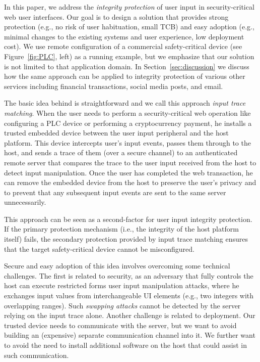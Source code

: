  In this paper, we address the \emph{integrity protection} of user input in security-critical web user interfaces. Our goal is to design a solution that provides strong protection (e.g., no risk of user habituation, small TCB) and easy adoption (e.g., minimal changes to the existing systems and user experience, low deployment cost). We use remote configuration of a commercial safety-critical device (see Figure~\ref{fig:PLC}, left) as a running example, but we emphasize that our solution is not limited to that application domain. In Section~\ref{sec:discussion} we discuss how the same approach can be applied to integrity protection of various other services including financial transactions, social media posts, and email.

The basic idea behind \name is straightforward and we call this approach \emph{input trace matching}.  When the user needs to perform a security-critical web operation like configuring a PLC device or performing a cryptocurrency payment, he installs a trusted embedded device between the user input peripheral and the host platform. This device intercepts user's input events, passes them through to the host, and sends a trace of them (over a secure channel) to an authenticated remote server that compares the trace to the user input received from the host to detect input manipulation. Once the user has completed the web transaction, he can remove the embedded device from the host to preserve the user's privacy and to prevent that any subsequent input events are sent to the same server unnecessarily.

This approach can be seen as a second-factor for user input integrity protection. If the primary protection mechanism (i.e., the integrity of the host platform itself) fails, the secondary protection provided by input trace matching ensures that the target safety-critical device cannot be misconfigured.

Secure and easy adoption of this idea involves overcoming some technical challenges. The first is related to security, as an adversary that fully controls the host can execute restricted forms user input manipulation attacks, where he exchanges input values from interchangeable UI elements (e.g., two integers with overlapping ranges). Such \emph{swapping attacks} cannot be detected by the server relying on the input trace alone. Another challenge is related to deployment. Our trusted device needs to communicate with the server, but we want to avoid building an (expensive) separate communication channel into it. We further want to avoid the need to install additional software on the host that could assist in such communication. 


